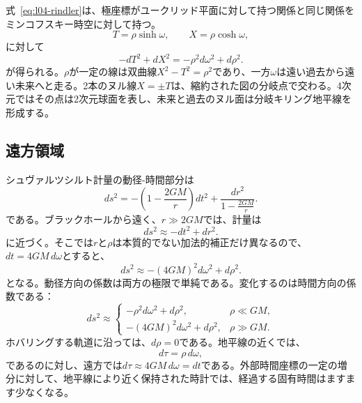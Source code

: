 式~\eqref{eq:l04-rindler}は、極座標がユークリッド平面に対して持つ関係と同じ関係をミンコフスキー時空に対して持つ。
\begin{equation}
T=\rho\sinh\omega,
\qquad
X=\rho\cosh\omega,
\end{equation}
に対して
\begin{equation}
-dT^2+dX^2=-\rho^2d\omega^2+d\rho^2.
\end{equation}
が得られる。\(\rho\)が一定の線は双曲線\(X^2-T^2=\rho^2\)であり、一方\(\omega\)は遠い過去から遠い未来へと走る。2本のヌル線\(X=\pm T\)は、縮約された図の分岐点で交わる。4次元ではその点は2次元球面を表し、未来と過去のヌル面は分岐キリング地平線を形成する。

\subsection{遠方領域}

シュヴァルツシルト計量の動径-時間部分は
\begin{equation}
ds^2
=-\left(1-\frac{2GM}{r}\right)dt^2
+\frac{dr^2}{1-\frac{2GM}{r}}.
\label{eq:l04-schwarzschild}
\end{equation}
である。ブラックホールから遠く、\(r\gg2GM\)では、計量は
\begin{equation}
ds^2\approx-dt^2+dr^2.
\end{equation}
に近づく。そこでは\(r\)と\(\rho\)は本質的でない加法的補正だけ異なるので、\(dt=4GM\,d\omega\)とすると、
\begin{equation}
ds^2\approx-(4GM)^2d\omega^2+d\rho^2.
\label{eq:l04-far}
\end{equation}
となる。動径方向の係数は両方の極限で単純である。変化するのは時間方向の係数である：
\begin{equation}
ds^2\approx
\begin{cases}
-\rho^2d\omega^2+d\rho^2, & \rho\ll GM,\\[3pt]
-(4GM)^2d\omega^2+d\rho^2, & \rho\gg GM.
\end{cases}
\label{eq:l04-two-limits}
\end{equation}
ホバリングする軌道に沿っては、\(d\rho=0\)である。地平線の近くでは、
\begin{equation}
d\tau=\rho\,d\omega,
\end{equation}
であるのに対し、遠方では\(d\tau\approx4GM\,d\omega=dt\)である。外部時間座標の一定の増分に対して、地平線により近く保持された時計では、経過する固有時間はますます少なくなる。

